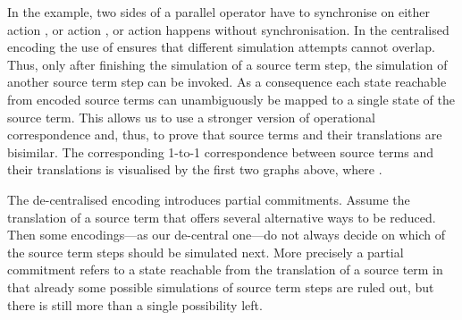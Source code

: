\documentclass[]{eptcs}
\begin{document}
  \begin{minipage}[c]{0.4\textwidth-2pt}
  \end{minipage}

  In the example, two sides of a parallel operator have to synchronise on either action , or action , or action  happens without synchronisation.
  In the centralised encoding  the use of  ensures that different simulation attempts cannot overlap. Thus, only after finishing the simulation of a source term step, the simulation of another source term step can be invoked. As a consequence each state reachable from encoded source terms can unambiguously be mapped to a single state of the source term. This allows us to use a stronger version of operational correspondence and, thus, to prove that source terms and their translations are bisimilar. The corresponding 1-to-1 correspondence between source terms and their translations is visualised by the first two graphs above, where .

  The de-centralised encoding  introduces partial commitments.
  Assume the translation of a source term that offers several alternative ways to be reduced. Then some encodings---as our de-central one---do not always decide on which of the source term steps should be simulated next. More precisely a partial commitment refers to a state reachable from the translation of a source term in that already some possible simulations of source term steps are ruled out, but there is still more than a single possibility left.
\end{document}
